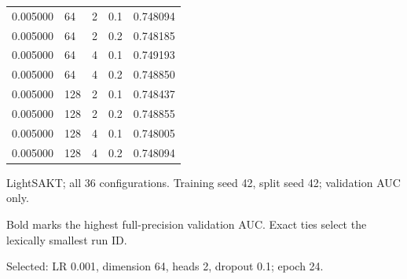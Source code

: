 \begin{table}[htbp]
{\begin{tabular}{lllll}
0.005000 & 64 & 2 & 0.1 & 0.748094 \\
0.005000 & 64 & 2 & 0.2 & 0.748185 \\
0.005000 & 64 & 4 & 0.1 & 0.749193 \\
0.005000 & 64 & 4 & 0.2 & 0.748850 \\
0.005000 & 128 & 2 & 0.1 & 0.748437 \\
0.005000 & 128 & 2 & 0.2 & 0.748855 \\
0.005000 & 128 & 4 & 0.1 & 0.748005 \\
0.005000 & 128 & 4 & 0.2 & 0.748094 \\
\bottomrule
\end{tabular}}
\begin{minipage}{\textwidth}\footnotesize
LightSAKT; all 36 configurations. Training seed 42, split seed 42; validation AUC only.\par Bold marks the highest full-precision validation AUC. Exact ties select the lexically smallest run ID.\par Selected: LR 0.001, dimension 64, heads 2, dropout 0.1; epoch 24.
\end{minipage}
\end{table}
